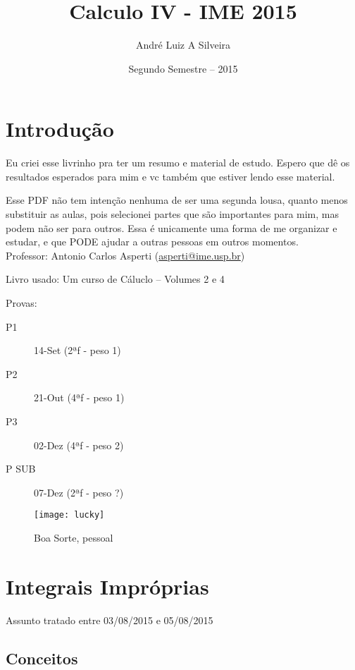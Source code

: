 \documentclass[12pt,openany]{book}
\title{Calculo IV - IME 2015}
\author{André Luiz A Silveira}
\date{Segundo Semestre -- 2015}
\begin{document}
\maketitle

\tableofcontents

\chapter*{Introdução}
\label{chap:c0}

\hspace{5mm} Eu criei esse livrinho pra ter um resumo e material de estudo. Espero que dê os resultados esperados para mim e vc também que estiver lendo esse material. 

Esse PDF não tem intenção nenhuma de ser uma segunda lousa, quanto menos substituir as aulas, pois selecionei partes que são importantes para mim, mas podem não ser para outros. Essa é unicamente uma forma de me organizar e estudar, e que PODE ajudar a outras pessoas em outros momentos.\\

Professor: 	Antonio Carlos Asperti (\href{mailto:asperti@ime.usp.br}{asperti@ime.usp.br})

Livro usado: Um curso de Cáluclo -- Volumes 2 e 4

Provas:
\begin{description}
\item[P1] 14-Set (2ªf - peso 1)
\item[P2] 21-Out (4ªf - peso 1)
\item[P3] 02-Dez (4ªf - peso 2)
\item[P SUB] 07-Dez (2ªf - peso ?)
\end{description}

\begin{figure}
\centering
\texttt{[image: lucky]}
\caption{Boa Sorte, pessoal}
\label{fig:lucky}
\end{figure}



\chapter{Integrais Impróprias}
\label{chap:c1}

\hspace{5mm} Assunto tratado entre 03/08/2015 e 05/08/2015
\section{Conceitos}
\label{sec:s11}
\end{document}
